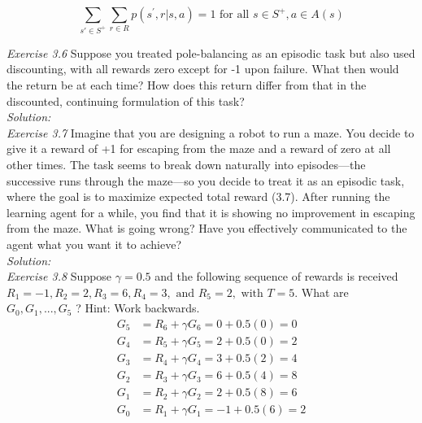 \documentclass{article}
\begin{document}
\[ \displaystyle\sum_{s' \in S^{+}} \sum_{r \in R} p(s^{'}, r|s, a) = 1 \text{ for all } s \in S^{+}, a \in A(s)\]

\noindent \textit{Exercise 3.6} Suppose you treated pole-balancing as an episodic task but also used discounting, with all rewards zero except for -1 upon failure. What then would the return be at each time? How does this return differ from that in the discounted, continuing formulation of this task? \\
\textit{Solution:} \\

\noindent \textit{Exercise 3.7} Imagine that you are designing a robot to run a maze. You decide to give it a reward of +1 for escaping from the maze and a reward of zero at all other times. The task seems to break down naturally into episodes—the successive runs through the maze—so you decide to treat it as an episodic task, where the goal is to maximize expected total reward (3.7). After running the learning agent for a while, you find that it is showing no improvement in escaping from the maze. What is going wrong? Have you effectively communicated to the agent what you want it to achieve? \\
\textit{Solution:} \\

\noindent \textit{Exercise 3.8} Suppose $\gamma = 0.5$ and the following sequence of rewards is received $R_{1} = -1, R_{2} = 2, R_{3} = 6, R_{4} = 3, \text{ and } R_{5} = 2, \text{ with } T = 5$. What are $G_{0} , G_{1} , . . ., G_{5}$ ? Hint: Work backwards. \\
\begin{align*}
  G_{5} &= R_{6} + \gamma G_{6} = 0 + 0.5(0) = 0 \\
  G_{4} &= R_{5} + \gamma G_{5} = 2 + 0.5(0) = 2 \\
  G_{3} &= R_{4} + \gamma G_{4} = 3 + 0.5(2) = 4 \\
  G_{2} &= R_{3} + \gamma G_{3} = 6 + 0.5(4) = 8 \\
  G_{1} &= R_{2} + \gamma G_{2} = 2 + 0.5(8) = 6 \\
  G_{0} &= R_{1} + \gamma G_{1} = -1 + 0.5(6) = 2 \\
\end{align*}
\end{document}
